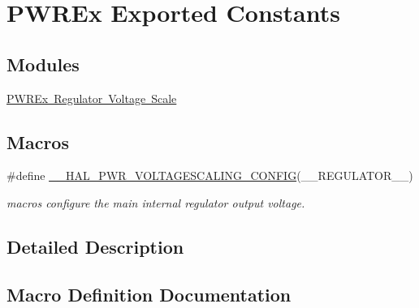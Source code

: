 \hypertarget{group___p_w_r_ex___exported___constants}{}\section{P\+W\+R\+Ex Exported Constants}
\label{group___p_w_r_ex___exported___constants}
\subsection*{Modules}
\begin{DoxyCompactItemize}
\item 
\mbox{\hyperlink{group___p_w_r_ex___regulator___voltage___scale}{P\+W\+R\+Ex Regulator Voltage Scale}}
\end{DoxyCompactItemize}
\subsection*{Macros}
\begin{DoxyCompactItemize}
\item 
\#define \mbox{\hyperlink{group___p_w_r_ex___exported___constants_ga1ee778f7ff494723bd0ef04ec44b0f77}{\+\_\+\+\_\+\+H\+A\+L\+\_\+\+P\+W\+R\+\_\+\+V\+O\+L\+T\+A\+G\+E\+S\+C\+A\+L\+I\+N\+G\+\_\+\+C\+O\+N\+F\+IG}}(\+\_\+\+\_\+\+R\+E\+G\+U\+L\+A\+T\+O\+R\+\_\+\+\_\+)
\begin{DoxyCompactList}\small\item\em macros configure the main internal regulator output voltage. \end{DoxyCompactList}\end{DoxyCompactItemize}


\subsection{Detailed Description}


\subsection{Macro Definition Documentation}
\mbox{\label{group___p_w_r_ex___exported___constants_ga1ee778f7ff494723bd0ef04ec44b0f77}} 
